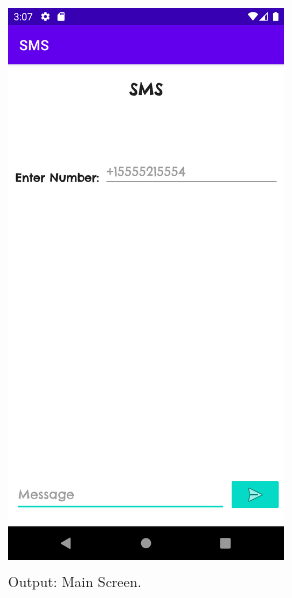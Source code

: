 \documentclass[12pt, a4]{article}
\begin{document}
\newpage
\subsection*{}
\begin{flushleft}

\end{flushleft}


\newpage
\subsection*{}
\begin{figure}[h]
\centering
\caption{Output: Main Screen.}
\includegraphics[height=15cm, width=7.3cm]{SMS/Screenshots/Output-1.png}
\end{figure}

\newpage
\end{document}
